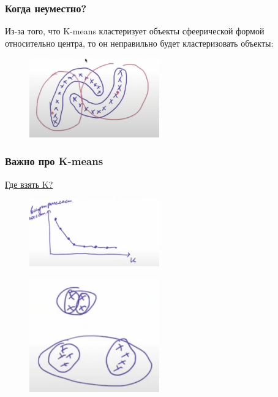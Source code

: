         \subsubsection{Когда неуместно?}
            Из-за того, что K-means кластеризует объекты сфеерической формой относительно центра, то он неправильно будет кластеризовать объекты:
            \begin{figure}[H]
                \centering
                \includegraphics[width=0.5\textwidth]{images/12lecture/kmeans_bad_example.png}
            \end{figure}

        \subsubsection{Важно про K-means}


            \underline{Где взять K?}
            \begin{figure}[H]
                \centering
                \includegraphics[width=0.5\textwidth]{images/12lecture/searching_K.png}
            \end{figure}
            \begin{figure}[H]
                \centering
                \includegraphics[width=0.5\textwidth]{images/12lecture/searching_K2.png}
            \end{figure}

